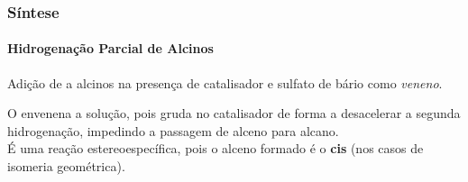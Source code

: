 
\begin{frame}
\frametitle{Síntese}
\framesubtitle{Hidrogenação Parcial de Alcinos}

Adição de  a alcinos na presença de catalisador e sulfato de bário como \textit{veneno}.

\begin{figure}
\centering
{}
\end{figure}

O  envenena a solução, pois gruda no catalisador de forma a desacelerar a segunda hidrogenação, impedindo a passagem de
alceno para alcano.\\
É uma reação estereoespecífica, pois o alceno formado é o \textbf{cis} (nos casos de isomeria geométrica).

\end{frame}
